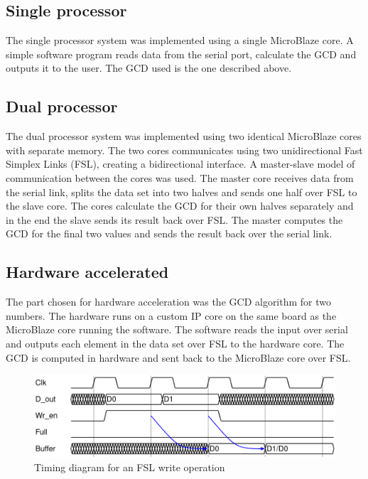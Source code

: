 \documentclass[11pt]{article}
\begin{document}
\subsection{Single processor}
The single processor system was implemented using a single MicroBlaze core. A simple software program reads data from the serial port, calculate the GCD and outputs it to the user. The GCD used is the one described above.

\subsection{Dual processor}
The dual processor system was implemented using two identical MicroBlaze cores with separate memory. The two cores communicates using two unidirectional Fast Simplex Links (FSL), creating a bidirectional interface. A master-slave model of communication between the cores was used. The master core receives data from the serial link, splits the data set into two halves and sends one half over FSL to the slave core. The cores calculate the GCD for their own halves separately and in the end the slave sends its result back over FSL. The master computes the GCD for the final two values and sends the result back over the serial link.

\subsection{Hardware accelerated}
The part chosen for hardware acceleration was the GCD algorithm for two numbers. The hardware runs on a custom IP core on the same board as the MicroBlaze core running the software. The software reads the input over serial and outputs each element in the data set over FSL to the hardware core. The GCD is computed in hardware and sent back to the MicroBlaze core over FSL.

\begin{figure}[!htb]
   \centering
   \includegraphics[width=1\textwidth]{timingdiagrams/write.pdf}
   \caption{Timing diagram for an FSL write operation}
   \label{fig:fsl-write}
\end{figure}
\end{document}
